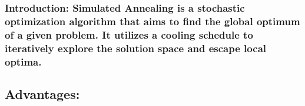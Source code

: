 \documentclass[11pt]{article}
\begin{document}
\hypertarget{introduction-simulated-annealing-is-a-stochastic-optimization-algorithm-that-aims-to-find-the-global-optimum-of-a-given-problem.-it-utilizes-a-cooling-schedule-to-iteratively-explore-the-solution-space-and-escape-local-optima.}{%
\subsubsection{\texorpdfstring{ Introduction: Simulated Annealing is a
stochastic optimization algorithm that aims to find the global optimum
of a given problem. It utilizes a cooling schedule to iteratively
explore the solution space and escape local
optima.}{  Introduction: Simulated Annealing is a stochastic optimization algorithm that aims to find the global optimum of a given problem. It utilizes a cooling schedule to iteratively explore the solution space and escape local optima.}}\label{introduction-simulated-annealing-is-a-stochastic-optimization-algorithm-that-aims-to-find-the-global-optimum-of-a-given-problem.-it-utilizes-a-cooling-schedule-to-iteratively-explore-the-solution-space-and-escape-local-optima.}}

\hypertarget{advantages}{%
\subsection{\texorpdfstring{
Advantages:}{  Advantages:}}\label{advantages}}
\end{document}
